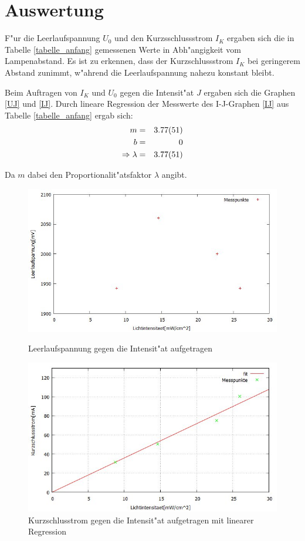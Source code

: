 \section{Auswertung}
	\label{sec:auswertung}

	F"ur die Leerlaufspannung $U_0$ und den Kurzsschlussstrom $I_K$ ergaben sich die in Tabelle \eqref{tabelle_anfang} gemessenen Werte in Abh"angigkeit vom Lampenabstand.
	Es ist zu erkennen, dass der Kurzschlussstrom $I_K$ bei geringerem Abstand zunimmt, w"ahrend die Leerlaufspannung nahezu konstant bleibt.

	

	Beim Auftragen von $I_K$ und $U_0$ gegen die Intensit"at $J$ ergaben sich die Graphen \eqref{UJ} und \eqref{IJ}.
	Durch lineare Regression der Messwerte des I-J-Graphen \eqref{IJ} aus Tabelle \eqref{tabelle_anfang} ergab sich:\\  

	\begin{eqnarray*}
		m &=& \SI{3.77 (51)}{}\\
		b &=& 0\\
		\Rightarrow \lambda &=& \SI{3.77 (51)}{}
	\end{eqnarray*}

	Da $m$ dabei den Proportionalit"atsfaktor $\lambda$ angibt.

	\begin{figure}[htbp]
		\centering
		\includegraphics[width = 12cm]{img/UJ.jpg}
		\caption{Leerlaufspannung gegen die Intensit"at aufgetragen}
		\label{UJ}

		
		\centering
		\includegraphics[width = 12cm]{img/IJ.jpg}
		\caption{Kurzschlusstrom gegen die Intensit"at aufgetragen mit linearer Regression}
		\label{IJ}
	\end{figure}

